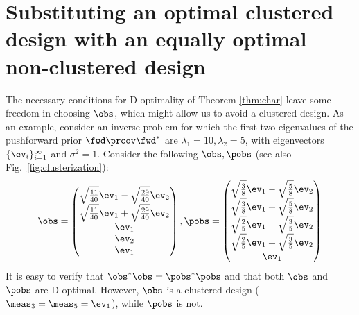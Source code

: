 \section{Substituting an optimal clustered design with an equally optimal non-clustered design}\label{section:how}
%
The necessary conditions for D-optimality of Theorem \ref{thm:char}
leave some freedom in choosing $\obs$, which might allow us to avoid a
clustered design. As an example, consider an inverse problem for which
the first two eigenvalues of the pushforward prior $\fwd \prcov\fwd^*$
are $\lambda_1 = 10, \lambda_2 = 5$, with eigenvectors
$\{\ev_i\}_{i=1}^\infty$ and $\sigma^2=1$. Consider the following
$\obs, \pobs$ (see also Fig.~\ref{fig:clusterization}):
\begin{equation}\label{eq:two designs}
  \obs =
  \begin{pmatrix}
    \sqrt{\frac{11}{40}}\ev_1 - \sqrt{\frac{29}{40}}\ev_2 \\
    \sqrt{\frac{11}{40}}\ev_1 + \sqrt{\frac{29}{40}}\ev_2 \\
    \ev_1 \\
    \ev_2 \\
    \ev_1 \\    
  \end{pmatrix},
  \pobs =
  \begin{pmatrix}
    \sqrt{\frac{3}{8}}\ev_1 - \sqrt{\frac{5}{8}}\ev_2 \\
    \sqrt{\frac{3}{8}}\ev_1 + \sqrt{\frac{5}{8}}\ev_2 \\
    \sqrt{\frac{2}{5}}\ev_1 - \sqrt{\frac{3}{5}}\ev_2 \\
    \sqrt{\frac{2}{5}}\ev_1 + \sqrt{\frac{3}{5}}\ev_2 \\
    \ev_1 \\    
  \end{pmatrix}
\end{equation}
\noindent It is easy to verify that $\obs^*\obs = \pobs^*\pobs$
and that both $\obs$ and $\pobs$ are D-optimal. However, $\obs$
is a clustered design ($\meas_3 = \meas_5 = \ev_1$), while $\pobs$ is
not.

